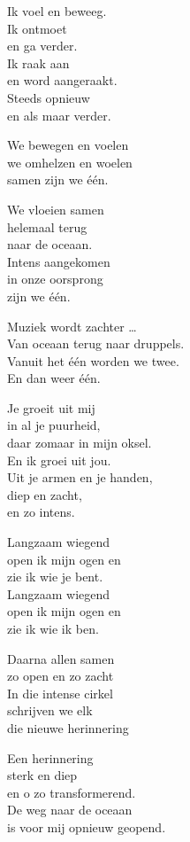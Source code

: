 \documentclass[
  11pt,
]{book}
\begin{document}
Ik voel en beweeg.\\
Ik ontmoet\\
en ga verder.\\
Ik raak aan\\
en word aangeraakt.\\
Steeds opnieuw\\
en als maar verder.

We bewegen en voelen\\
we omhelzen en woelen\\
samen zijn we één.

We vloeien samen\\
helemaal terug\\
naar de oceaan.\\
Intens aangekomen\\
in onze oorsprong\\
zijn we één.

Muziek wordt zachter \ldots{}\\
Van oceaan terug naar druppels.\\
Vanuit het één worden we twee.\\
En dan weer één.

Je groeit uit mij\\
in al je puurheid,\\
daar zomaar in mijn oksel.\\
En ik groei uit jou.\\
Uit je armen en je handen,\\
diep en zacht,\\
en zo intens.

Langzaam wiegend\\
open ik mijn ogen en\\
zie ik wie je bent.\\
Langzaam wiegend\\
open ik mijn ogen en\\
zie ik wie ik ben.

Daarna allen samen\\
zo open en zo zacht\\
In die intense cirkel\\
schrijven we elk\\
die nieuwe herinnering

Een herinnering\\
sterk en diep\\
en o zo transformerend.\\
De weg naar de oceaan\\
is voor mij opnieuw geopend.
\end{document}
